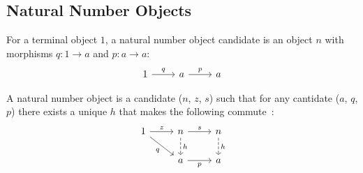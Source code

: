 \subsection{Natural Number Objects}
\begin{definition}
	For a terminal object $1$, a natural number object candidate is an object $n$
	with morphisms $q: 1 \to a$ and $p: a \to a$:
	\[\begin{tikzcd}[ampersand replacement=\&]
		1 \& a \& a
		\arrow["q", from=1-1, to=1-2]
		\arrow["p", from=1-2, to=1-3]
	\end{tikzcd}\]

	A natural number object is a candidate ($n$, $z$, $s$) such that for any
	cantidate ($a$, $q$, $p$) there exists a unique $h$ that makes the following
	commute~\parencite[p.~246]{awodey:category_theory}:
	\[\begin{tikzcd}[ampersand replacement=\&]
		1 \& n \& n \\
		\& a \& a
		\arrow["z", from=1-1, to=1-2]
		\arrow["q"', from=1-1, to=2-2]
		\arrow["s", from=1-2, to=1-3]
		\arrow["p"', from=2-2, to=2-3]
		\arrow["h", dashed, from=1-2, to=2-2]
		\arrow["h", dashed, from=1-3, to=2-3]
	\end{tikzcd}\]
\end{definition}
